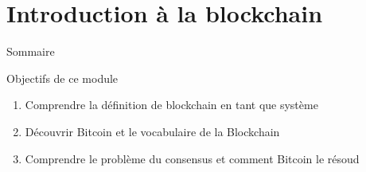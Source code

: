 \section{Introduction à la blockchain}

\begin{frame}{Sommaire}
  \setcounter{tocdepth}{2}
\end{frame}

\begin{frame}{Objectifs de ce module}
  \begin{enumerate}
    \item Comprendre la définition de blockchain en tant que système
    \item Découvrir Bitcoin et le vocabulaire de la Blockchain
    \item Comprendre le problème du consensus et comment Bitcoin le résoud
  \end{enumerate}
\end{frame}


